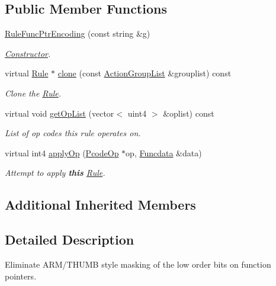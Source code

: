\subsection*{Public Member Functions}
\begin{DoxyCompactItemize}
\item 
\mbox{\hyperlink{class_rule_func_ptr_encoding_ad780526b76dcbae30cfaed4ae912c914}{Rule\+Func\+Ptr\+Encoding}} (const string \&g)
\begin{DoxyCompactList}\small\item\em \mbox{\hyperlink{class_constructor}{Constructor}}. \end{DoxyCompactList}\item 
virtual \mbox{\hyperlink{class_rule}{Rule}} $\ast$ \mbox{\hyperlink{class_rule_func_ptr_encoding_a6738c42c8cf1be1152c573c815206876}{clone}} (const \mbox{\hyperlink{class_action_group_list}{Action\+Group\+List}} \&grouplist) const
\begin{DoxyCompactList}\small\item\em Clone the \mbox{\hyperlink{class_rule}{Rule}}. \end{DoxyCompactList}\item 
virtual void \mbox{\hyperlink{class_rule_func_ptr_encoding_a8f25db221c10666f0857bc9650f46113}{get\+Op\+List}} (vector$<$ uint4 $>$ \&oplist) const
\begin{DoxyCompactList}\small\item\em List of op codes this rule operates on. \end{DoxyCompactList}\item 
virtual int4 \mbox{\hyperlink{class_rule_func_ptr_encoding_ab4cf320ff9f365e41dde30a21dc7a277}{apply\+Op}} (\mbox{\hyperlink{class_pcode_op}{Pcode\+Op}} $\ast$op, \mbox{\hyperlink{class_funcdata}{Funcdata}} \&data)
\begin{DoxyCompactList}\small\item\em Attempt to apply {\bfseries{this}} \mbox{\hyperlink{class_rule}{Rule}}. \end{DoxyCompactList}\end{DoxyCompactItemize}
\subsection*{Additional Inherited Members}


\subsection{Detailed Description}
Eliminate A\+R\+M/\+T\+H\+U\+MB style masking of the low order bits on function pointers. 

